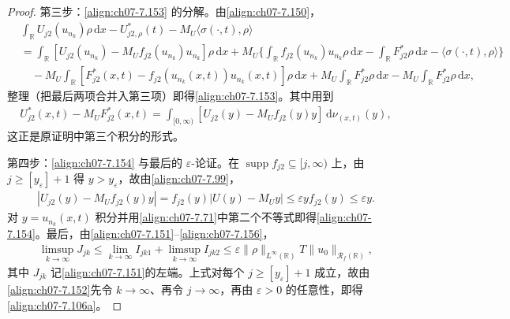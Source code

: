\documentclass[../../main.tex]{subfiles}%
\begin{document}
\begin{proof}
第三步：\eqref{align:ch07-7.153} 的分解。由\eqref{align:ch07-7.150}，
\begin{align*}
&\int_{\mathbb{R}}U_{j2}(u_{n_k})\rho\,\mathrm{d}x-U_{j2,\rho}^*(t)-M_U\langle\sigma(\cdot,t),\rho\rangle\\
&=\int_{\mathbb{R}}[U_{j2}(u_{n_k})-M_Uf_{j2}(u_{n_k})u_{n_k}]\rho\,\mathrm{d}x
+M_U\Big\{\int_{\mathbb{R}}f_{j2}(u_{n_k})u_{n_k}\rho\,\mathrm{d}x-\int_{\mathbb{R}}F_{j2}^*\rho\,\mathrm{d}x-\langle\sigma(\cdot,t),\rho\rangle\Big\}\\
&\quad-M_U\int_{\mathbb{R}}[F_{j2}^*(x,t)-f_{j2}(u_{n_k}(x,t))u_{n_k}(x,t)]\rho\,\mathrm{d}x
+M_U\int_{\mathbb{R}}F_{j2}^*\rho\,\mathrm{d}x-M_U\int_{\mathbb{R}}F_{j2}^*\rho\,\mathrm{d}x,
\end{align*}
整理（把最后两项合并入第三项）即得\eqref{align:ch07-7.153}。其中用到
\begin{align*}
U_{j2}^*(x,t)-M_UF_{j2}^*(x,t)=\int_{[0,\infty)}[U_{j2}(y)-M_Uf_{j2}(y)y]\,\mathrm{d}\nu_{(x,t)}(y),
\end{align*}
这正是原证明中第三个积分的形式。

第四步：\eqref{align:ch07-7.154} 与最后的 $\varepsilon$-论证。在 $\operatorname{supp}f_{j2}\subseteq[j,\infty)$ 上，由 $j\geqslant[y_\varepsilon]+1$ 得 $y>y_\varepsilon$，故由\eqref{align:ch07-7.99}，
\begin{align*}
|U_{j2}(y)-M_Uf_{j2}(y)y|=f_{j2}(y)|U(y)-M_Uy|\leqslant\varepsilon yf_{j2}(y)\leqslant\varepsilon y.
\end{align*}
对 $y=u_{n_k}(x,t)$ 积分并用\eqref{align:ch07-7.71}中第二个不等式即得\eqref{align:ch07-7.154}。最后，由\eqref{align:ch07-7.151}--\eqref{align:ch07-7.156}，
\begin{align*}
\limsup_{k\to\infty}J_{jk}\leqslant\lim_{k\to\infty}I_{jk1}+\limsup_{k\to\infty}I_{jk2}\leqslant\varepsilon\|\rho\|_{L^\infty(\mathbb{R})}T\|u_0\|_{\mathscr{R}_f(\mathbb{R})},
\end{align*}
其中 $J_{jk}$ 记\eqref{align:ch07-7.151}的左端。上式对每个 $j\geqslant[y_\varepsilon]+1$ 成立，故由\eqref{align:ch07-7.152}先令 $k\to\infty$、再令 $j\to\infty$，再由 $\varepsilon>0$ 的任意性，即得\eqref{align:ch07-7.106a}。
\end{proof}
\end{document}
